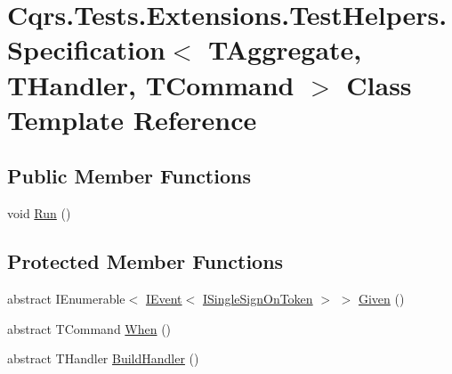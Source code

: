 \hypertarget{classCqrs_1_1Tests_1_1Extensions_1_1TestHelpers_1_1Specification}{}\section{Cqrs.\+Tests.\+Extensions.\+Test\+Helpers.\+Specification$<$ T\+Aggregate, T\+Handler, T\+Command $>$ Class Template Reference}
\label{classCqrs_1_1Tests_1_1Extensions_1_1TestHelpers_1_1Specification}
\subsection*{Public Member Functions}
\begin{DoxyCompactItemize}
\item 
void \hyperlink{classCqrs_1_1Tests_1_1Extensions_1_1TestHelpers_1_1Specification_a97928e7375f3049c5e97792794e7aa37}{Run} ()
\end{DoxyCompactItemize}
\subsection*{Protected Member Functions}
\begin{DoxyCompactItemize}
\item 
abstract I\+Enumerable$<$ \hyperlink{interfaceCqrs_1_1Events_1_1IEvent}{I\+Event}$<$ \hyperlink{interfaceCqrs_1_1Authentication_1_1ISingleSignOnToken}{I\+Single\+Sign\+On\+Token} $>$ $>$ \hyperlink{classCqrs_1_1Tests_1_1Extensions_1_1TestHelpers_1_1Specification_a9996d9316da203e2492ad117bc0ed4b4}{Given} ()
\item 
abstract T\+Command \hyperlink{classCqrs_1_1Tests_1_1Extensions_1_1TestHelpers_1_1Specification_a1adc4d52947bd3613ea40559fe9c8a11}{When} ()
\item 
abstract T\+Handler \hyperlink{classCqrs_1_1Tests_1_1Extensions_1_1TestHelpers_1_1Specification_ac3a9d99fb6cde79dfa42167ac013cb7a}{Build\+Handler} ()
\end{DoxyCompactItemize}
